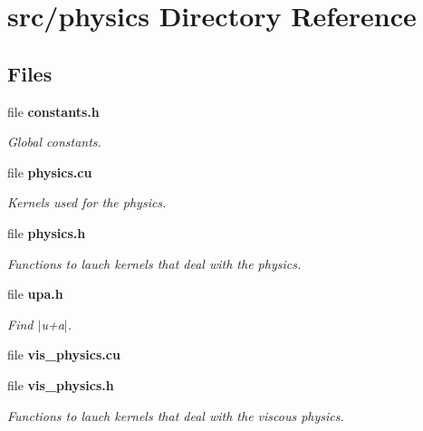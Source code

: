 \section{src/physics Directory Reference}
\label{dir_8250e12e5a19acb8ece30f1703b6dc16}
\subsection*{Files}
\begin{DoxyCompactItemize}
\item 
file {\bf constants.\-h}
\begin{DoxyCompactList}\small\item\em Global constants. \end{DoxyCompactList}\item 
file {\bf physics.\-cu}
\begin{DoxyCompactList}\small\item\em Kernels used for the physics. \end{DoxyCompactList}\item 
file {\bf physics.\-h}
\begin{DoxyCompactList}\small\item\em Functions to lauch kernels that deal with the physics. \end{DoxyCompactList}\item 
file {\bf upa.\-h}
\begin{DoxyCompactList}\small\item\em Find $\vert$u+a$\vert$. \end{DoxyCompactList}\item 
file {\bfseries vis\-\_\-physics.\-cu}
\item 
file {\bf vis\-\_\-physics.\-h}
\begin{DoxyCompactList}\small\item\em Functions to lauch kernels that deal with the viscous physics. \end{DoxyCompactList}\end{DoxyCompactItemize}
